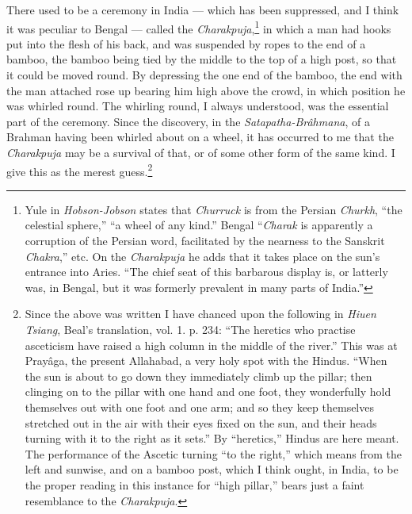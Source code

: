 \documentclass[a4paper, 11pt, oneside, polutonikogreek, english]{article}
\begin{document}
There used to be a ceremony in India --- which has been suppressed, and I think it was peculiar to Bengal --- called the \emph{Charakpuja},\footnote{Yule in \emph{Hobson-Jobson} states that \emph{Churruck} is from the Persian \emph{Churkh}, ``the celestial sphere,'' ``a wheel of any kind.'' Bengal ``\emph{Charak} is apparently a corruption of the Persian word, facilitated by the nearness to the Sanskrit \emph{Chakra},'' etc. On the \emph{Charakpuja} he adds that it takes place on the sun's entrance into Aries. ``The chief seat of this barbarous display is, or latterly was, in Bengal, but it was formerly prevalent in many parts of India.''} in which a man had hooks put into the flesh of his back, and was suspended by ropes to the end of a bamboo, the bamboo being tied by the middle to the top of a high post, so that it could be moved round. By depressing the one end of the bamboo, the end with the man attached rose up bearing him high above the crowd, in which position he was whirled round. The whirling round, I always understood, was the essential part of the ceremony. Since the discovery, in the \emph{Satapatha-Brâhmana}, of a Brahman having been whirled about on a wheel, it has occurred to me that the \emph{Charakpuja} may be a survival of that, or of some other form of the same kind. I give this as the merest guess.\footnote{Since the above was written I have chanced upon the following in \emph{Hiuen Tsiang}, Beal's translation, vol. 1. p. 234: ``The heretics who practise asceticism have raised a high column in the middle of the river.'' This was at Prayâga, the present Allahabad, a very holy spot with the Hindus. ``When the sun is about to go down they immediately climb up the pillar; then clinging on to the pillar with one hand and one foot, they wonderfully hold themselves out with one foot and one arm; and so they keep themselves stretched out in the air with their eyes fixed on the sun, and their heads turning with it to the right as it sets.'' By ``heretics,'' Hindus are here meant. The performance of the Ascetic turning ``to the right,'' which means from the left and sunwise, and on a bamboo post, which I think ought, in India, to be the proper reading in this instance for ``high pillar,'' bears just a faint resemblance to the \emph{Charakpuja}.}
\end{document}
